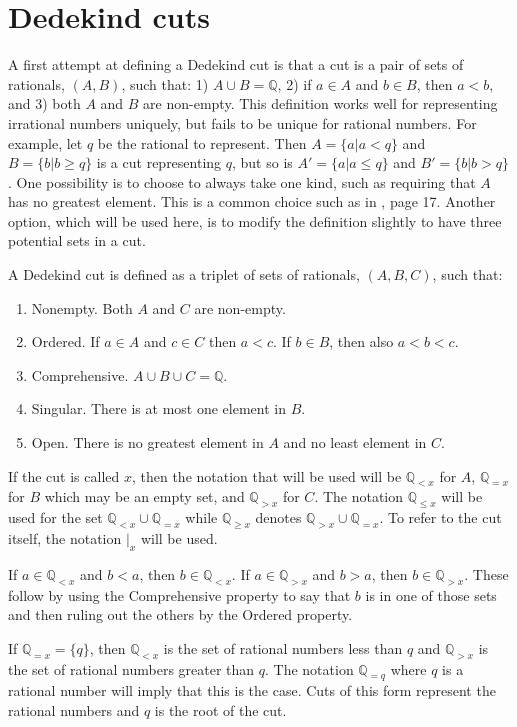 \documentclass[12pt]{article}
\newcommand{\qcut}[2][x]{\ensuremath{\mathbb{Q}_{#2 #1}}}
\newcommand{\qlt}[1][x]{\qcut[#1]{<}}
\newcommand{\qeq}[1][x]{\qcut[#1]{=}}
\newcommand{\qgt}[1][x]{\qcut[#1]{>}}
\newcommand{\qgeq}[1][x]{\qcut[#1]{\geq}}
\newcommand{\qleq}[1][x]{\qcut[#1]{\leq}}
\newcommand{\cut}[1][x]{{\vert}_{#1} }
\begin{document}
\section{Dedekind cuts}

A first attempt at defining a Dedekind cut is that a cut is a pair of sets of rationals, $(A, B)$, such that: 1) $A \cup B = \mathbb{Q}$, 2) if $a \in A$ and $b \in B$, then $a < b$, and 3) both $A$ and $B$ are non-empty. This definition works well for representing irrational numbers uniquely, but fails to be unique for rational numbers. For example, let $q$ be the rational to represent. Then $A = \{a | a < q\}$ and $B= \{b | b \geq q\}$ is a cut representing $q$, but so is  $A' = \{a | a \leq q\}$ and $B'= \{b | b > q\}$. One possibility is to choose to always take one kind, such as requiring that $A$ has no greatest element. This is a common choice such as in \cite{rudin}, page 17. Another option, which will be used here, is to modify the definition slightly to have three potential sets in a cut.

A Dedekind cut is defined as a triplet of sets of rationals, $(A, B, C)$, such that: 
\begin{enumerate}
    \item Nonempty. Both $A$ and $C$ are non-empty.
    \item Ordered. If $a \in A$ and $c \in C$ then $a < c$. If $b \in B$, then also $a < b < c$. 
    \item Comprehensive. $A \cup B \cup C = \mathbb{Q}$.
    \item Singular. There is at most one element in $B$.
    \item Open. There is no greatest element in $A$ and no least element in $C$.
\end{enumerate}
If the cut is called $x$, then the notation that will be used will be $\qlt$ for $A$, $\qeq$ for $B$ which may be an empty set, and $\qgt$ for $C$. The notation $\qleq$ will be used for the set $\qlt \cup \qeq$ while $\qgeq$ denotes $\qgt \cup \qeq$. To refer to the cut itself, the notation $\cut$ will be used. 

If $a \in \qlt$ and $b < a$, then $b \in \qlt$. If $a \in \qgt$ and $ b > a$, then $b \in \qgt$. These follow by using the Comprehensive property to say that $b$ is in one of those sets and then ruling out the others by the Ordered property. 

If $\qeq = \{q\}$, then $\qlt$ is the set of rational numbers less than $q$ and $\qgt$ is the set of rational numbers greater than $q$. The notation $\qeq[q]$ where $q$ is a rational number will imply that this is the case. Cuts of this form represent the rational numbers and $q$ is the root of the cut. 
\end{document}

